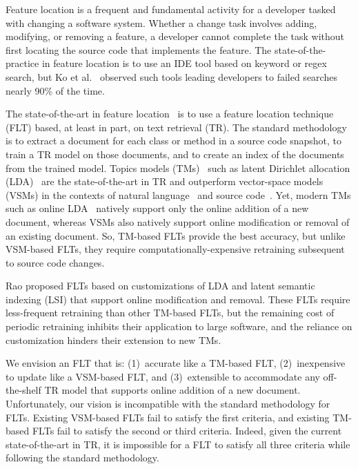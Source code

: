 
Feature location is a frequent and fundamental activity for a developer tasked
with changing a software system. Whether a change task involves adding,
modifying, or removing a feature, a developer cannot complete the task without
first locating the source code that implements the feature. The
state-of-the-practice in feature location is to use an IDE tool based on keyword
or regex search, but Ko et al.~\cite{Ko-etal_2006} observed such tools leading
developers to failed searches nearly 90\% of the time.

The state-of-the-art in feature location~\cite{Dit-etal_2013a} is to use a
feature location technique (FLT) based, at least in part, on text retrieval
(TR). The standard methodology~\cite{Marcus-etal_2004} is to extract a document
for each class or method in a source code snapshot, to train a TR model on those
documents, and to create an index of the documents from the trained model.
Topics models (TMs)~\cite{Blei_2012} such as latent Dirichlet allocation
(LDA)~\cite{Blei-etal_2003} are the state-of-the-art in TR and outperform
vector-space models (VSMs) in the contexts of natural
language~\cite{Deerwester-etal_1990,Blei-etal_2003} and source
code~\cite{Poshyvanyk-etal_2007,Lukins-etal_2010}. Yet, modern TMs such as
online LDA~\cite{Hoffman-etal_2010} natively support only the online addition of
a new document, whereas VSMs also natively support online modification or
removal of an existing document. So, TM-based FLTs provide the best accuracy,
but unlike VSM-based FLTs, they require computationally-expensive retraining
subsequent to source code changes.

Rao\cite{Rao_2013} proposed FLTs based on customizations of LDA and latent
semantic indexing (LSI) that support online modification and removal.
These FLTs require less-frequent retraining than other TM-based FLTs, but the
remaining cost of periodic retraining inhibits their application to large
software, and the reliance on customization hinders their extension to new TMs.

We envision an FLT that is: (1)~accurate like a TM-based FLT, (2)~inexpensive to
update like a VSM-based FLT, and (3)~extensible to accommodate any off-the-shelf
TR model that supports online addition of a new document. Unfortunately, our
vision is incompatible with the standard methodology for FLTs. Existing
VSM-based FLTs fail to satisfy the first criteria, and existing TM-based FLTs
fail to satisfy the second or third criteria. Indeed, given the current
state-of-the-art in TR, it is impossible for a FLT to satisfy all three criteria
while following the standard methodology.

